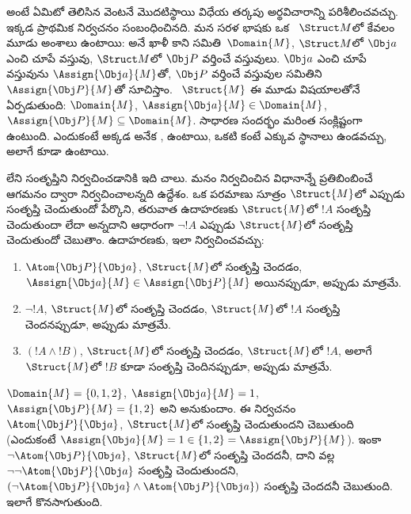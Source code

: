 \documentclass[../../../include/open-logic-section]{subfiles}
\begin{document}


 అంటే ఏమిటో తెలిసిన వెంటనే మొదటిస్థాయి విధేయ తర్కపు
అర్థవిచారాన్ని పరిశీలించవచ్చు. ఇక్కడ ప్రాథమిక నిర్వచనం
 సంబంధించినది. మన సరళ భాషకు ఒక ~$\Struct M$లో
కేవలం మూడు అంశాలు ఉంటాయి: \emph{} అనే ఖాళీ కాని
సమితి~$\Domain{M}$, $\Struct M$లో $\Obj a$ ఎంచి చూపే వస్తువు,
$\Struct M$లో $\Obj P$ వర్తించే వస్తువులు. $\Obj a$ ఎంచి చూపే
వస్తువును $\Assign{\Obj a}{M}$తో, $\Obj P$ వర్తించే వస్తువుల
సమితిని $\Assign{\Obj P}{M}$తో సూచిస్తాం. ~$\Struct{M}$
ఈ మూడు విషయాలతోనే ఏర్పడుతుంది: $\Domain{M}$,
$\Assign{\Obj a}{M} \in \Domain{M}$, $\Assign{\Obj P}{M}
\subseteq \Domain{M}$. సాధారణ సందర్భం మరింత సంక్లిష్టంగా ఉంటుంది.
ఎందుకంటే అక్కడ అనేక ,  ఉంటాయి,
 ఒకటి కంటే ఎక్కువ స్థానాలు ఉండవచ్చు, అలాగే
 కూడా ఉంటాయి.

 లేని  సంతృప్తిని నిర్వచించడానికి ఇది చాలు.  మనం నిర్వచించిన విధానాన్నే ప్రతిబింబించే
ఆగమనం ద్వారా నిర్వచించాలన్నది ఉద్దేశం. ఒక పరమాణు సూత్రం
  $\Struct{M}$లో ఎప్పుడు సంతృప్తి చెందుతుందో పేర్కొని, తరువాత ఉదాహరణకు
  $\Struct{M}$లో $!A$ సంతృప్తి చెందుతుందా లేదా అన్నదాని ఆధారంగా $\lnot !A$ ఎప్పుడు
$\Struct{M}$లో సంతృప్తి చెందుతుందో చెబుతాం. ఉదాహరణకు, ఇలా
నిర్వచించవచ్చు:
\begin{enumerate}
  \item $\Atom{\Obj P}{\Obj a}$, $\Struct{M}$లో సంతృప్తి చెందడం,
  $\Assign{\Obj a}{M} \in \Assign{\Obj P}{M}$ అయినప్పుడూ, అప్పుడు
  మాత్రమే.
  \item $\lnot !A$, $\Struct{M}$లో సంతృప్తి చెందడం, $\Struct{M}$లో $!A$
  సంతృప్తి చెందనప్పుడూ, అప్పుడు మాత్రమే.
  \item $(!A \land !B)$, $\Struct{M}$లో సంతృప్తి చెందడం,
  $\Struct{M}$లో $!A$, అలాగే $\Struct{M}$లో $!B$ కూడా సంతృప్తి
  చెందినప్పుడూ, అప్పుడు మాత్రమే.
\end{enumerate}
$\Domain{M} = \{0, 1, 2\}$, $\Assign{\Obj a}{M} = 1$,
$\Assign{\Obj P}{M} = \{1, 2\}$ అని అనుకుందాం. ఈ నిర్వచనం
$\Atom{\Obj P}{\Obj a}$, $\Struct{M}$లో సంతృప్తి చెందుతుందని
చెబుతుంది (ఎందుకంటే $\Assign{\Obj a}{M} =  1 \in \{1,2\} =
\Assign{\Obj P}{M}$). ఇంకా $\lnot \Atom{\Obj P}{\Obj a}$,
$\Struct{M}$లో సంతృప్తి చెందదనీ, దాని వల్ల $\lnot\lnot
\Atom{\Obj P}{\Obj a}$ సంతృప్తి చెందుతుందని, $(\lnot
\Atom{\Obj P}{\Obj a} \land \Atom{\Obj P}{\Obj a})$ సంతృప్తి
చెందదనీ చెబుతుంది. ఇలాగే కొనసాగుతుంది.
\end{document}
